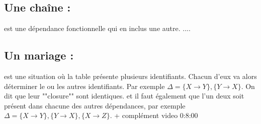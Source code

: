 \documentclass[12pt, a4paper, oneside, titlepage]{book}%
\begin{document}
\subsection{Une chaîne : } 
est une dépendance fonctionnelle qui en inclus une autre.
....

\subsection{ Un mariage : }
est une situation où la table présente plusieurs identifiants. Chacun d'eux va alors déterminer le ou les autres identifiants. Par exemple $\Delta = \{  X \rightarrow Y \}, \{  Y \rightarrow X \}$. On dit que leur ""closure"" sont identiques. et il faut également que l'un deux soit présent dans chacune des autres dépendances, par exemple $\Delta = \{  X \rightarrow Y \}, \{  Y \rightarrow X \}, \{ X \rightarrow Z\}$.
+ complément video 0:8:00



\clearpage
\end{document}
